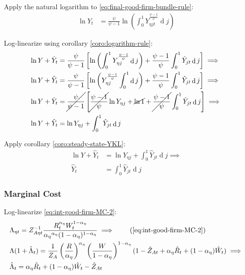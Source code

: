 \documentclass[
	12pt,
	]{article}
\numberwithin{equation}{section}
\DeclareMathOperator{\dif}{d}
\theoremstyle{definition}
\theoremstyle{plain}
\theoremstyle{plain}
\theoremstyle{plain}
\begin{document}
Apply the natural logarithm to \ref{eq:final-good-firm-bundle-rule}:
\begin{align}
	\ln Y_t &= \frac{\psi}{\psi-1} \ln \left( \int_{0}^{1} Y_{\eta jt}^{\frac{\psi-1}{\psi}} \dif j \right) \nonumber
\end{align}

Log-linearize using corollary \ref{coro:logarithm-rule}:
\begin{align}
	\ln Y + \hat{Y}_t &= \frac{\psi}{\psi-1} \left[ \ln \left( \int_{0}^{1} Y_{\eta j}^{\frac{\psi-1}{\psi}} \dif j \right) + \frac{\psi-1}{\psi} \int_{0}^{1} \hat{Y}_{jt} \dif j \right] \implies \nonumber
	\\
	\ln Y + \hat{Y}_t &= \frac{\psi}{\psi-1} \left[ \ln \left( Y_{\eta j}^{\frac{\psi-1}{\psi}} \int_{0}^{1} \dif j \right) + \frac{\psi-1}{\psi} \int_{0}^{1} \hat{Y}_{jt} \dif j \right] \implies \nonumber
	\\
	\ln Y + \hat{Y}_t &= \cancel{\frac{\psi}{\psi-1}} \left[ \cancel{\frac{\psi-1}{\psi}} \ln Y_{\eta j} + \cancel{\ln1} + \cancel{\frac{\psi-1}{\psi}} \int_{0}^{1} \hat{Y}_{jt} \dif j \right] \implies \nonumber
	\\
	\ln Y + \hat{Y}_t &= \ln Y_{\eta j} + \int_{0}^{1} \hat{Y}_{jt} \dif j \nonumber
\end{align}

Apply corollary \ref{coro:steady-state-YKL}:
\begin{align}
	\ln Y + \hat{Y}_t &= \ln Y_{\eta j} + \int_{0}^{1} \hat{Y}_{jt} \dif j \implies \nonumber \\
	\hat{Y}_t &= \int_{0}^{1} \hat{Y}_{jt} \dif j 
	\label{eq:ll-final-good-firm-bundle-rule}
\end{align}


\subsubsection{Marginal Cost}

Log-linearize \ref{eq:int-good-firm-MC-2}:
\begin{alignat}{2}
	& \Lambda_{\eta t} = Z_{A\eta t}^{-1} \frac{R_t^{\alpha_\eta} W_t^{1-{\alpha_\eta}} }{ {\alpha_\eta}^{\alpha_\eta} (1-{\alpha_\eta})^{1-{\alpha_\eta}} } \implies \tag{\ref{eq:int-good-firm-MC-2}} \\
	& \Lambda (1+ \hat{\Lambda}_t) = \frac{1}{Z_{A}} \left( \frac{R}{\alpha_\eta} \right)^{\alpha_\eta} \left( \frac{W}{1-{\alpha_\eta}} \right)^{1-{\alpha_\eta}} (1- \hat{Z}_{At} + {\alpha_\eta} \hat{R}_t + (1- {\alpha_\eta}) \hat{W}_t ) \implies \nonumber \\
	& \hat{\Lambda}_t = {\alpha_\eta} \hat{R}_t + (1- {\alpha_\eta}) \hat{W}_t - \hat{Z}_{At} \label{eq:ll-int-good-firm-MC-2}
\end{alignat}
\end{document}
